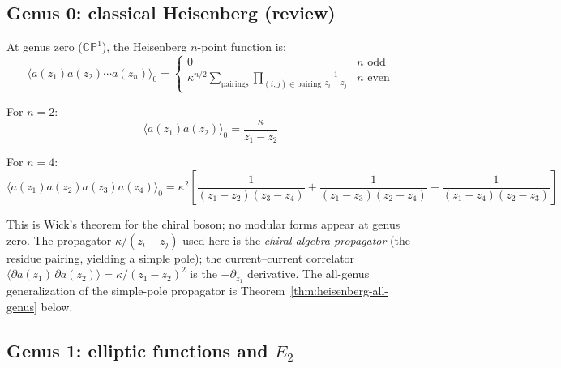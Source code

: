 \subsection{Genus 0: classical Heisenberg (review)}
\label{subsec:heisenberg-genus-zero}

\begin{theorem}\label{thm:heisenberg-genus-zero}
At genus zero ($\mathbb{CP}^1$), the Heisenberg $n$-point function is:
\begin{equation}
\langle a(z_1) a(z_2) \cdots a(z_n) \rangle_0 =
\begin{cases}
0 & n \text{ odd} \\
\kappa^{n/2} \sum_{\text{pairings}} \prod_{(i,j) \in \text{pairing}} \frac{1}{z_i - z_j}
& n \text{ even}
\end{cases}
\end{equation}

For $n=2$:
\[\langle a(z_1) a(z_2) \rangle_0 = \frac{\kappa}{z_1 - z_2}\]

For $n=4$:
\[\langle a(z_1) a(z_2) a(z_3) a(z_4) \rangle_0 = \kappa^2 \left[
\frac{1}{(z_1-z_2)(z_3-z_4)} + \frac{1}{(z_1-z_3)(z_2-z_4)} +
\frac{1}{(z_1-z_4)(z_2-z_3)}
\right]\]

This is Wick's theorem for the chiral boson; no modular forms appear at genus zero.
The propagator $\kappa/(z_i - z_j)$ used here is the \emph{chiral algebra propagator}
(the residue pairing, yielding a simple pole); the current--current correlator
$\langle \partial a(z_1)\, \partial a(z_2)\rangle = \kappa/(z_1-z_2)^2$ is
the $-\partial_{z_1}$ derivative. The all-genus generalization of the
simple-pole propagator is Theorem~\ref{thm:heisenberg-all-genus} below.
\end{theorem}

\subsection{\texorpdfstring{Genus 1: elliptic functions and $E_2$}{Genus 1: elliptic functions and E 2}}
\label{subsec:heisenberg-genus-one-complete}

